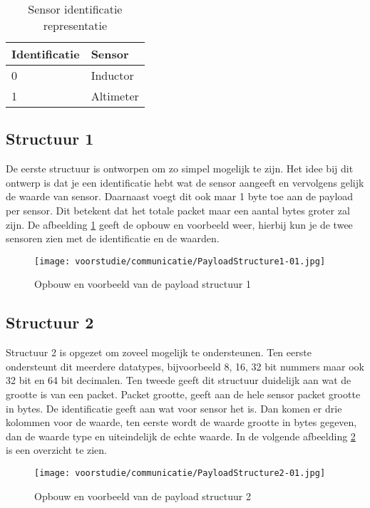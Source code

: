 \begin{table}[h!]
	\centering
	\caption{Sensor identificatie representatie}
	\label{tab:SensorRep}
	\begin{tabular}{p{4cm}p{6cm}}
	\toprule
	Identificatie & Sensor        \\ \midrule
	0      & Inductor  \\
	1      & Altimeter \\ \bottomrule
	\end{tabular}%
\end{table}

\subsection{Structuur 1}
De eerste structuur is ontworpen om zo simpel mogelijk te zijn. Het idee bij dit ontwerp is dat je een identificatie hebt wat de sensor aangeeft en vervolgens gelijk de waarde van sensor. Daarnaast voegt dit ook maar 1 byte toe aan de payload per sensor. Dit betekent dat het totale packet maar een aantal bytes groter zal zijn. De afbeelding \ref{fig:Structure1} geeft de opbouw en voorbeeld weer, hierbij kun je de twee sensoren zien met de identificatie en de waarden.
\begin{figure}[h!]
	\centering
	\label{fig:Structure1}


	\texttt{[image: voorstudie/communicatie/PayloadStructure1-01.jpg]}
	\caption{Opbouw en voorbeeld van de payload structuur 1}
\end{figure}

\newpage
\subsection{Structuur 2}
Structuur 2 is opgezet om zoveel mogelijk te ondersteunen. Ten eerste ondersteunt dit meerdere datatypes, bijvoorbeeld 8, 16, 32 bit nummers maar ook 32 bit en 64 bit decimalen. Ten tweede geeft dit structuur duidelijk aan wat de grootte is van een packet. Packet grootte, geeft aan de hele sensor packet grootte in bytes. De identificatie geeft aan wat voor sensor het is. Dan komen er drie kolommen voor de waarde, ten eerste wordt de waarde grootte in bytes gegeven, dan de waarde type en uiteindelijk de echte waarde. In de volgende afbeelding \ref{fig:Structure2} is een overzicht te zien.
\begin{figure}[h!]
	\centering
	\label{fig:Structure2}

	\texttt{[image: voorstudie/communicatie/PayloadStructure2-01.jpg]}
	\caption{Opbouw en voorbeeld van de payload structuur 2}
\end{figure}

